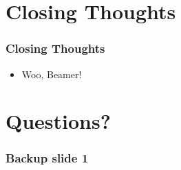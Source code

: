 \documentclass[aspectratio=169]{beamer}
\begin{document}
	\section{Closing Thoughts}
		\begin{frame}
			\frametitle{Closing Thoughts}
			\begin{itemize}
				\item Woo, Beamer!
			\end{itemize}
		\end{frame}
	
	\section{Questions?}
		
	
	\appendix
	\backupbegin
	  \begin{frame}
	    \frametitle{Backup slide 1}
	    \blindtext
	  \end{frame}
	\backupend
\end{document}
